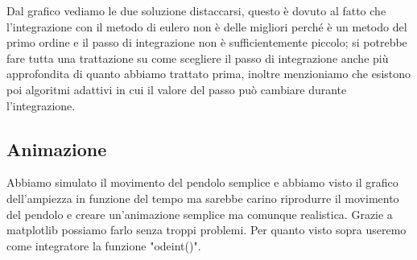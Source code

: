 \documentclass[10pt,a4paper]{article}
\begin{document}
Dal grafico vediamo le due soluzione distaccarsi, questo è dovuto al fatto che l'integrazione con il metodo di eulero non è delle migliori perché è un metodo del primo ordine e il passo di integrazione non è sufficientemente piccolo; si potrebbe fare tutta una trattazione su come scegliere il passo di integrazione anche più approfondita di quanto abbiamo trattato prima, inoltre menzioniamo  che esistono poi algoritmi adattivi in cui il valore del passo può cambiare durante l'integrazione.

\subsection{Animazione}
Abbiamo simulato il movimento del pendolo semplice e abbiamo visto il grafico dell'ampiezza in funzione del tempo ma sarebbe carino riprodurre il movimento del pendolo e creare un'animazione semplice ma comunque realistica. Grazie a matplotlib possiamo farlo senza troppi problemi. Per quanto visto sopra useremo come integratore la funzione "odeint()".
\end{document}
